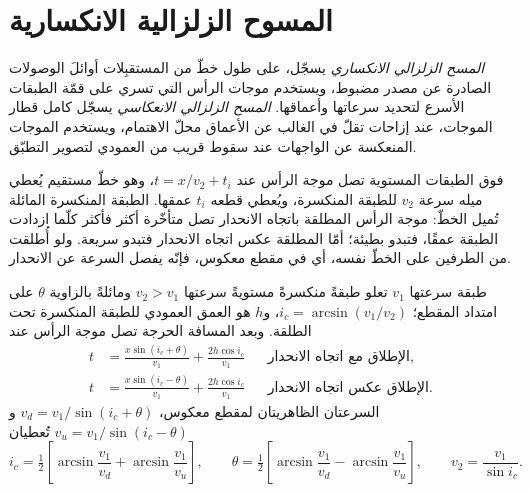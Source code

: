 \section{المسوح الزلزالية الانكسارية}

\begin{definition}\label{def:b3:exploration-seismology:surveys}
\emph{المسح الزلزالي الانكساري} يسجّل، على طول
خطّ من المستقبِلات أوائلَ الوصولات الصادرة عن مصدر مضبوط، ويستخدم
موجات الرأس التي تسري على قمّة الطبقات الأسرع لتحديد سرعاتها
وأعماقها. \emph{المسح الزلزالي الانعكاسي} يسجّل
كامل قطار الموجات، عند إزاحات تقلّ في الغالب عن الأعماق محلّ الاهتمام،
ويستخدم الموجات المنعكسة عن الواجهات عند سقوط قريب من العمودي
لتصوير التطبّق.
\end{definition}

فوق الطبقات المستوية تصل موجة الرأس عند $t = x/v_2 + t_i$، وهو خطّ مستقيم
يُعطي ميله سرعة $v_2$ للطبقة المنكسرة، ويُعطي قطعه $t_i$
عمقها. الطبقة المنكسرة المائلة تُميل الخطّ: موجة الرأس المطلقة باتجاه الانحدار
تصل متأخّرة أكثر فأكثر كلّما ازدادت الطبقة عمقًا، فتبدو بطيئة؛
أمّا المطلقة عكس اتجاه الانحدار فتبدو سريعة. ولو أُطلقت من الطرفين على الخطّ نفسه،
أي في مقطع معكوس، فإنّه يفصل السرعة عن الانحدار.

\begin{theorem}\label{thm:b3:exploration-seismology:dipping}
طبقة سرعتها $v_1$ تعلو طبقةً منكسرةً مستويةً سرعتها $v_2 > v_1$ ومائلةً
بالزاوية $\theta$ على امتداد المقطع؛ $i_c = \arcsin(v_1/v_2)$، و$h$ هو
العمق العمودي للطبقة المنكسرة تحت الطلقة. وبعد المسافة الحرجة
تصل موجة الرأس عند
\begin{align*}
  t &= \frac{x\sin(i_c + \theta)}{v_1} + \frac{2h\cos i_c}{v_1}
  &&\text{الإطلاق مع اتجاه الانحدار},\\
  t &= \frac{x\sin(i_c - \theta)}{v_1} + \frac{2h\cos i_c}{v_1}
  &&\text{الإطلاق عكس اتجاه الانحدار}.
\end{align*}
السرعتان الظاهريتان لمقطع معكوس، $v_d = v_1/\sin(i_c + \theta)$
و$v_u = v_1/\sin(i_c - \theta)$ تُعطيان
\[
  i_c = \tfrac12\left[\arcsin\frac{v_1}{v_d} + \arcsin\frac{v_1}{v_u}\right],\qquad
  \theta = \tfrac12\left[\arcsin\frac{v_1}{v_d} - \arcsin\frac{v_1}{v_u}\right],
  \qquad v_2 = \frac{v_1}{\sin i_c} .
\]
\end{theorem}

